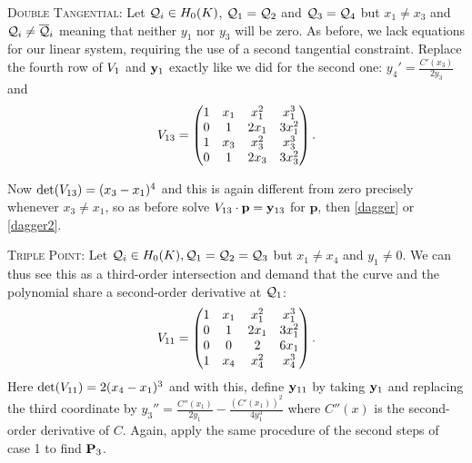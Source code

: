\documentclass[english,11pt,a4paper]{article}
\begin{document}
\begin{case}
	{\scshape Double Tangential:} Let $\q_i \in \enk$, $\q_1 = \q_2$ and $\q_3 = \q_4$ but $x_1 \neq x_3$ and $\q_i \neq \bar \q_i$ meaning that neither $y_1$ nor $y_3$ will be zero. As before, we lack equations for our linear system, requiring the use of a second tangential constraint. Replace the fourth row of $\Vdoub$ and $\ydoub$ exactly like we did for the second one: $y_4'=\frac{C'(x_3)}{2 y_3}$ and
	\begin{align*}\Vddoub=
		\begin{pmatrix}
			1 & x_1 & x_1^2 & x_1^3\\
			0 & 1 & 2 x_1 & 3 x_1^2\\
			1 & x_3 & x_3^2 & x_3^3\\
			0 & 1 & 2 x_3 & 3 x_3^2\\
		\end{pmatrix}.
	\end{align*}

	Now $\det(\Vddoub)=(x_3-x_1)^4$ and this is again different from zero precisely whenever $x_3 \neq x_1$, so as before solve $\Vddoub \cdot \mathbf{p} = \yddoub$ for $\mathbf{p}$, then \eqref{dagger} or \eqref{dagger2}.
\end{case}

\begin{case}
	{\scshape Triple Point:} Let $\q_i \in \enk , \q_1=\q_2=\q_3$ but $x_1 \neq x_4$ and $y_1 \neq 0$. We can thus see this as a third-order intersection and demand that the curve and the polynomial share a second-order derivative at $\q_1$:
	\begin{align*}\Vtri=
			\begin{pmatrix}
			1 & x_1 & x_1^2 & x_1^3\\
			0 & 1 & 2 x_1 & 3 x_1^2\\
			0 & 0 & 2 & 6x_1\\
			1 & x_4 & x_4^2 & x_4^3\\
		\end{pmatrix}.
	\end{align*}
	Here $\det(\Vtri)=2(x_4-x_1)^3$ and with this, define $\ytri$ by taking $\ydoub$ and replacing the third coordinate by $y_3'' = \frac{C''(x_1)}{2y_1}-\frac{(C'(x_1))^2}{4y_1^3}$ where $C''(x)$ is the second-order derivative of $C$. Again, apply the same procedure of the second steps of case 1 to find $\P_3$.

\end{case}
\end{document}

